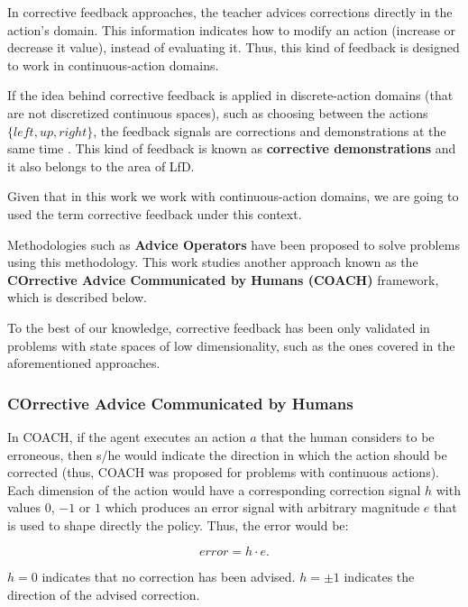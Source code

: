 In corrective feedback approaches, the teacher advices corrections directly in the action's domain. This information indicates how to modify an action (increase or decrease it value), instead of evaluating it. Thus, this kind of feedback is designed to work in continuous-action domains. 

If the idea behind corrective feedback is applied in discrete-action domains (that are not discretized continuous spaces), such as choosing between the actions $\{left, up, right\}$, the feedback signals  are corrections and demonstrations at the same time \cite{chernova2009interactive, mericcli2010complementary}. This kind of feedback is known as \textbf{corrective demonstrations} and it also belongs to the area of LfD. 

Given that in this work we work with continuous-action domains, we are going to used the term corrective feedback under this context.  

Methodologies such as \textbf{Advice Operators} \cite{Argall2009, Argall2008} have been proposed to solve problems using this methodology. This work studies another approach known as the \textbf{COrrective Advice Communicated by Humans (COACH)} \cite{Celemin2018AnInteractive} framework, which is described below. 

 To the best of our knowledge, corrective feedback has been only validated in problems with state spaces of low dimensionality, such as the ones covered in the aforementioned approaches. 

\subsubsection{COrrective Advice Communicated by Humans}
In COACH, if the agent executes an action $a$ that the human considers to be erroneous, then s/he would indicate the direction in which the action should be corrected (thus, COACH was proposed for problems with continuous actions). Each dimension of the action would have a corresponding correction signal $h$ with values $0$, $-1$ or $1$ which produces an error signal with arbitrary magnitude $e$ that is used to shape directly the policy. Thus, the error would be: 

\begin{equation}\label{eq:error}
    error=h \cdot e.
\end{equation}

$h=0$ indicates that no correction has been advised. $h=\pm 1$ indicates the direction of the advised correction.

